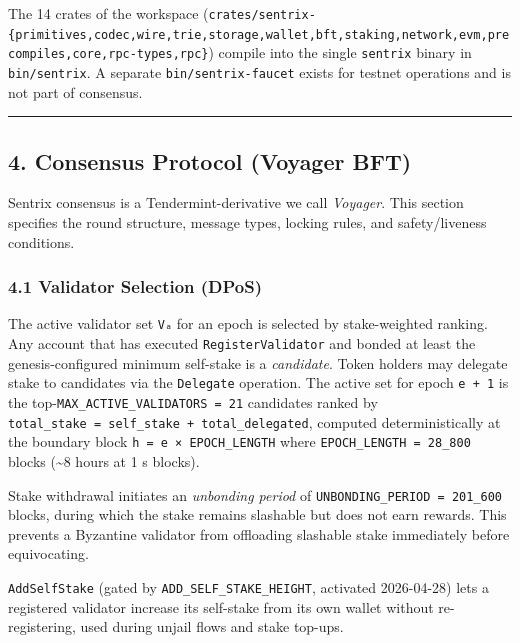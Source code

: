 \documentclass[11pt,a4paper]{article}
\begin{document}
The 14 crates of the workspace
(\texttt{crates/sentrix-\{primitives,codec,wire,trie,storage,wallet,bft,staking,network,evm,precompiles,core,rpc-types,rpc\}})
compile into the single \texttt{sentrix} binary in \texttt{bin/sentrix}.
A separate \texttt{bin/sentrix-faucet} exists for testnet operations and
is not part of consensus.

\begin{center}\rule{0.5\linewidth}{0.5pt}\end{center}

\hypertarget{4-consensus-protocol-voyager-bft}{%
\subsection{4. Consensus Protocol (Voyager
BFT)}\label{4-consensus-protocol-voyager-bft}}

Sentrix consensus is a Tendermint-derivative we call \emph{Voyager}.
This section specifies the round structure, message types, locking
rules, and safety/liveness conditions.

\hypertarget{41-validator-selection-dpos}{%
\subsubsection{4.1 Validator Selection
(DPoS)}\label{41-validator-selection-dpos}}

The active validator set \texttt{Vₐ} for an epoch is selected by
stake-weighted ranking. Any account that has executed
\texttt{RegisterValidator} and bonded at least the genesis-configured
minimum self-stake is a \emph{candidate}. Token holders may delegate
stake to candidates via the \texttt{Delegate} operation. The active set
for epoch \texttt{e\ +\ 1} is the
top-\texttt{MAX\_ACTIVE\_VALIDATORS\ =\ 21} candidates ranked by
\texttt{total\_stake\ =\ self\_stake\ +\ total\_delegated}, computed
deterministically at the boundary block
\texttt{h\ =\ e\ ×\ EPOCH\_LENGTH} where
\texttt{EPOCH\_LENGTH\ =\ 28\_800} blocks (\textasciitilde8 hours at 1 s
blocks).

Stake withdrawal initiates an \emph{unbonding period} of
\texttt{UNBONDING\_PERIOD\ =\ 201\_600} blocks, during which the stake
remains slashable but does not earn rewards. This prevents a Byzantine
validator from offloading slashable stake immediately before
equivocating.

\texttt{AddSelfStake} (gated by \texttt{ADD\_SELF\_STAKE\_HEIGHT},
activated 2026-04-28) lets a registered validator increase its
self-stake from its own wallet without re-registering, used during
unjail flows and stake top-ups.
\end{document}

